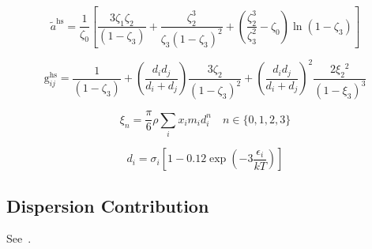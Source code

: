 \documentclass[12pt, letterpaper]{article}
\begin{document}
\begin{equation}
    \tilde{a}^{\mathrm{hs}} =\frac{1}{\zeta_{0}}\left[\frac{3 \zeta_{1} \zeta_{2}}{\left(1-\zeta_{3}\right)}+\frac{\zeta_{2}^3}{\zeta_{3}\left(1-\zeta_{3}\right)^2}+\left(\frac{\zeta_{2}^3}{\zeta_{3}^2}-\zeta_{0}\right) \ln \left(1-\zeta_{3}\right)\right]
    \label{eq:ares_hs}
\end{equation}


\begin{equation}
    \mathrm{g}_{i j}^{\mathrm{hs}}=\frac{1}{\left(1-\zeta_{3}\right)}+\left(\frac{d_{i} d_{j}}{d_{i}+d_{j}}\right) \frac{3 \zeta_{2}}{\left(1-\zeta_{3}\right)^2} + \left(\frac{d_{i} d_{j}}{d_{i}+d_{j}}\right)^2 \frac{2 \xi_{2}{ }^2}{\left(1-\xi_{3}\right)^3}
    \label{eq:g_hs_contact}
\end{equation}


\begin{equation}
    \xi_{n}=\frac{\pi}{6} \rho \sum_{i} x_{i} m_{i} d_{i}^n \quad n \in\{0,1,2,3\}
    \label{eq:zeta_n}
\end{equation}


\begin{equation}
    d_{i}=\sigma_{i}\left[1-0.12 \exp \left(-3 \frac{\epsilon_{i}}{k T}\right)\right]
    \label{eq:d_segment}
\end{equation}

\subsection{Dispersion Contribution}

See~\cite{Gross2001}.
\end{document}

